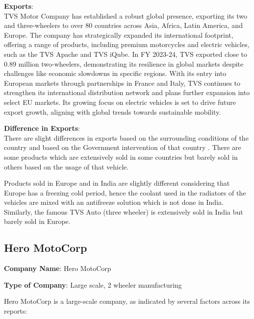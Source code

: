 \textbf{Exports}:\\
 TVS Motor Company \cite{TVS_ANNUAL_REPORT} has established a robust global presence, exporting its two and three-wheelers to over 80 countries across Asia, Africa, Latin America, and Europe. The company has strategically expanded its international footprint, offering a range of products, including premium motorcycles and electric vehicles, such as the TVS Apache and TVS iQube. In FY 2023-24, TVS exported close to 0.89 million two-wheelers, demonstrating its resilience in global markets despite challenges like economic slowdowns in specific regions. With its entry into European markets through partnerships in France and Italy, TVS continues to strengthen its international distribution network and plans further expansion into select EU markets. Its growing focus on electric vehicles is set to drive future export growth, aligning with global trends towards sustainable mobility.

\textbf{Difference in Exports}:\\
 There are slight differences in exports based on the surrounding conditions of the country and based on the Government intervention of that country \cite{tvs_international}. There are some products which are extensively sold in some countries but barely sold in others based on the usage of that vehicle.

Products sold in Europe and in India are slightly different considering that Europe has a freezing cold period, hence the coolant used in the radiators of the vehicles are mixed with an antifreeze solution which is not done in India. Similarly, the famous TVS Auto (three wheeler) is extensively sold in India but barely sold in Europe.

\subsection{Hero MotoCorp}

\textbf{Company Name}: Hero MotoCorp

\textbf{Type of Company}: Large scale, 2 wheeler manufacturing

Hero MotoCorp is a large-scale company, as indicated by several factors across its reports:

